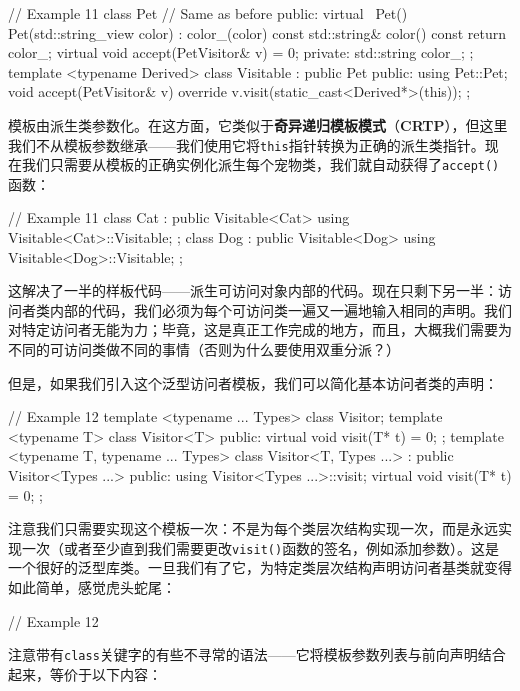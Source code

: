 \begin{code}
{\begin{code}
// Example 11
class Pet { // Same as before
  public:
  virtual ~Pet() {}
  Pet(std::string_view color) : color_(color) {}
  const std::string& color() const { return color_; }
  virtual void accept(PetVisitor& v) = 0;
  private:
  std::string color_;
};
template <typename Derived>
class Visitable : public Pet {
  public:
  using Pet::Pet;
  void accept(PetVisitor& v) override {
    v.visit(static_cast<Derived*>(this));
  }
};
\end{code}

模板由派生类参数化。在这方面，它类似于\textbf{奇异递归模板模式}（\textbf{CRTP}），但这里我们不从模板参数继承——我们使用它将\texttt{this}指针转换为正确的派生类指针。现在我们只需要从模板的正确实例化派生每个宠物类，我们就自动获得了\texttt{accept()}函数：

\begin{code}
// Example 11
class Cat : public Visitable<Cat> {
  using Visitable<Cat>::Visitable;
};
class Dog : public Visitable<Dog> {
  using Visitable<Dog>::Visitable;
};
\end{code}

这解决了一半的样板代码——派生可访问对象内部的代码。现在只剩下另一半：访问者类内部的代码，我们必须为每个可访问类一遍又一遍地输入相同的声明。我们对特定访问者无能为力；毕竟，这是真正工作完成的地方，而且，大概我们需要为不同的可访问类做不同的事情（否则为什么要使用双重分派？）

但是，如果我们引入这个泛型访问者模板，我们可以简化基本访问者类的声明：

\begin{code}
// Example 12
template <typename ... Types> class Visitor;
template <typename T> class Visitor<T> {
  public:
  virtual void visit(T* t) = 0;
};
template <typename T, typename ... Types>
class Visitor<T, Types ...> : public Visitor<Types ...> {
  public:
  using Visitor<Types ...>::visit;
  virtual void visit(T* t) = 0;
};
\end{code}

注意我们只需要实现这个模板一次：不是为每个类层次结构实现一次，而是永远实现一次（或者至少直到我们需要更改\texttt{visit()}函数的签名，例如添加参数）。这是一个很好的泛型库类。一旦我们有了它，为特定类层次结构声明访问者基类就变得如此简单，感觉虎头蛇尾：

\begin{code}
// Example 12
\end{code}

注意带有\texttt{class}关键字的有些不寻常的语法——它将模板参数列表与前向声明结合起来，等价于以下内容：

}
\end{code}

